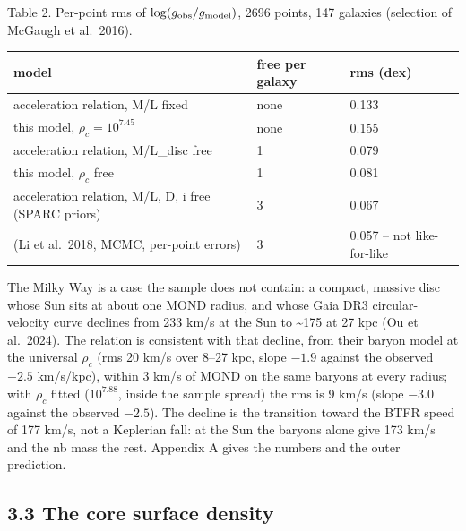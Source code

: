 \documentclass[
  10pt,
]{article}
\begin{document}
Table 2. Per-point rms of $\log(g_{\rm obs}/g_{\rm model})$, 2696 points, 147 galaxies (selection of McGaugh et al.~2016).

\begin{longtable}[]{@{}lll@{}}
\toprule
model & free per galaxy & rms (dex)\tabularnewline
\midrule
\endhead
acceleration relation, M/L fixed & none & 0.133\tabularnewline
this model, $\rho_c=10^{7.45}$ & none & 0.155\tabularnewline
acceleration relation, M/L\_disc free & 1 & 0.079\tabularnewline
this model, $\rho_c$ free & 1 & 0.081\tabularnewline
acceleration relation, M/L, D, i free (SPARC priors) & 3 &
0.067\tabularnewline
(Li et al.~2018, MCMC, per-point errors) & 3 & 0.057 -- not
like-for-like\tabularnewline
\bottomrule
\end{longtable}

The Milky Way is a case the sample does not contain: a compact, massive disc whose Sun sits at about one MOND radius, and whose Gaia DR3 circular-velocity curve declines from 233 km/s at the Sun to \textasciitilde{}175 at 27 kpc (Ou et al.~2024). The relation is consistent with that decline, from their baryon model at the universal $\rho_c$ (rms 20 km/s over 8--27 kpc, slope $-1.9$ against the observed $-2.5$ km/s/kpc), within 3 km/s of MOND on the same baryons at every radius; with $\rho_c$ fitted ($10^{7.88}$, inside the sample spread) the rms is 9 km/s (slope $-3.0$ against the observed $-2.5$). The decline is the transition toward the BTFR speed of 177 km/s, not a Keplerian fall: at the Sun the baryons alone give 173 km/s and the nb mass the rest. Appendix A gives the numbers and the outer prediction.

\subsection{3.3 The core surface density}\label{the-core-surface-density}
\end{document}
